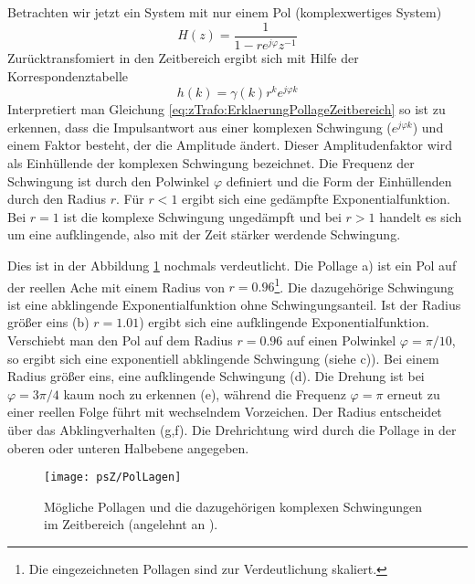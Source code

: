 Betrachten wir jetzt ein System mit nur einem Pol (komplexwertiges
System)
\begin{equation}\label{eq:zTrafo:ErklaerungPolLage}
    H(z) = \frac{1}{1-re^{j\varphi}z^{-1}}
\end{equation}
Zurücktransfomiert in den Zeitbereich ergibt sich mit Hilfe der
Korrespondenztabelle
\begin{equation}\label{eq:zTrafo:ErklaerungPollageZeitbereich}
    h(k) = \gamma(k) r^k e^{j\varphi k}
\end{equation}
Interpretiert man Gleichung
\ref{eq:zTrafo:ErklaerungPollageZeitbereich} so ist zu erkennen,
dass die Impulsantwort aus einer komplexen Schwingung
($e^{j\varphi k}$) und einem Faktor besteht, der die Amplitude
ändert. Dieser Amplitudenfaktor wird als Einhüllende der komplexen
Schwingung bezeichnet. Die Frequenz der Schwingung ist durch den
Polwinkel $\varphi$ definiert und die Form der Einhüllenden durch
den Radius $r$. Für $r<1$ ergibt sich eine gedämpfte
Exponentialfunktion. Bei $r=1$ ist die komplexe Schwingung
ungedämpft und bei $r>1$ handelt es sich um eine aufklingende,
also mit der Zeit stärker werdende Schwingung.

Dies ist in der Abbildung \ref{pic:bspPollagen} nochmals
verdeutlicht. Die Pollage a) ist ein Pol auf der reellen Ache mit
einem Radius von $r = 0.96$\footnote{Die eingezeichneten Pollagen
sind zur Verdeutlichung skaliert.}. Die dazugehörige Schwingung
ist eine abklingende Exponentialfunktion ohne Schwingungsanteil.
Ist der Radius größer
eins (b) $r= 1.01$) ergibt sich eine aufklingende
Exponentialfunktion. Verschiebt man den Pol auf dem Radius $r=
0.96$ auf einen Polwinkel $\varphi = \pi/10$, so ergibt sich eine
exponentiell abklingende Schwingung (siehe c)). Bei einem Radius
größer eins, eine aufklingende Schwingung (d). Die Drehung ist bei
$\varphi = 3\pi / 4$ kaum noch zu erkennen (e), während die
Frequenz $\varphi = \pi$ erneut zu einer reellen Folge führt mit
wechselndem Vorzeichen. Der Radius entscheidet über das
Abklingverhalten (g,f). Die Drehrichtung wird durch die Pollage in
der oberen oder unteren Halbebene angegeben.

\begin{figure}[H]
\begin{center}
\texttt{[image: psZ/PolLagen]}
\caption{\label{pic:bspPollagen}Mögliche Pollagen und die
dazugehörigen komplexen Schwingungen im Zeitbereich (angelehnt an \cite{girod2013einfuhrung}).}
\end{center}
\end{figure}

